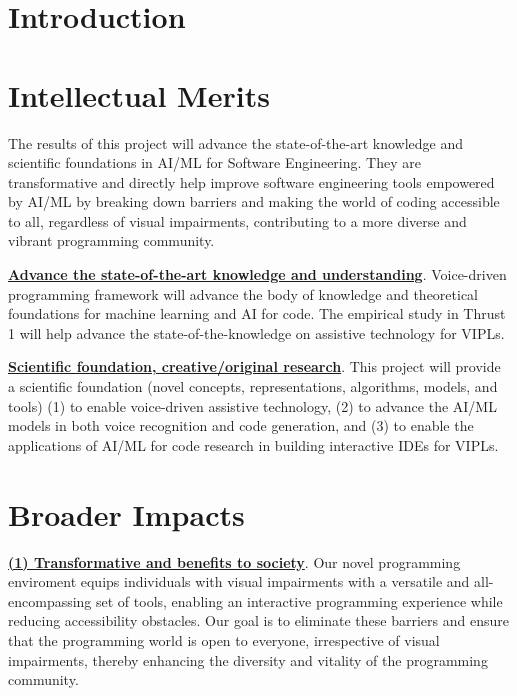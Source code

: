 \section{Introduction}\label{sec:intro}



%





\section{Intellectual Merits}

The results of this project will advance the state-of-the-art
knowledge and scientific foundations in AI/ML for Software
Engineering. They are transformative and directly help improve
software engineering tools empowered by AI/ML by breaking down
barriers and making the world of coding accessible to all, regardless
of visual impairments, contributing to a more diverse and vibrant
programming community.

\noindent \underline{{\bf Advance the state-of-the-art knowledge and
    understanding}}. Voice-driven programming framework will advance
the body of knowledge and theoretical foundations for machine learning
and AI for code. The empirical study in Thrust 1 will help advance the
state-of-the-knowledge on assistive technology for VIPLs.

\noindent \underline{{\bf Scientific foundation, creative/original
    research}}. This project will provide a scientific foundation
(novel concepts, representations, algorithms, models, and tools) (1)
to enable voice-driven assistive technology, (2) to advance the AI/ML
models in both voice recognition and code generation, and (3) to
enable the applications of AI/ML for code research in building
interactive IDEs for VIPLs.

\section{Broader Impacts}

\underline{{\bf (1) Transformative and benefits to society}}.  Our
novel programming enviroment equips individuals with visual
impairments with a versatile and all-encompassing set of tools,
enabling an interactive programming experience while reducing
accessibility obstacles. Our goal is to eliminate these barriers and
ensure that the programming world is open to everyone, irrespective of
visual impairments, thereby enhancing the diversity and vitality of
the programming community.


